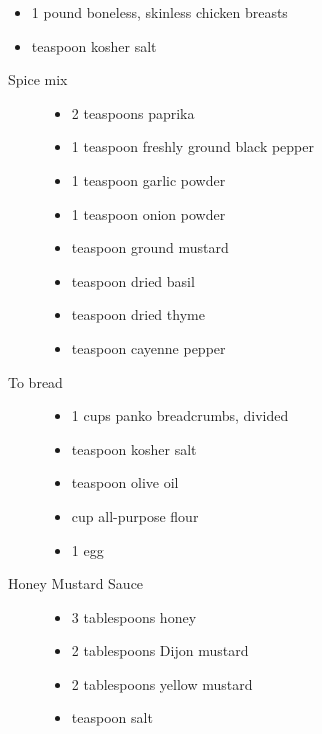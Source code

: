   \begin{itemize}
    \item 1 pound boneless, skinless chicken breasts
    \item {} teaspoon kosher salt
  \end{itemize}
\begin{description}
  \item[Spice mix]\hfill
    \begin{itemize}
    \item 2 teaspoons paprika
    \item 1 teaspoon freshly ground black pepper
    \item 1 teaspoon garlic powder
    \item 1 teaspoon onion powder
    \item {} teaspoon ground mustard
    \item {} teaspoon dried basil
    \item {} teaspoon dried thyme
    \item {} teaspoon cayenne pepper%
    \end{itemize}
  \item[To bread]\hfill
    \begin{itemize}
    \item 1 cups panko breadcrumbs, divided
    \item {} teaspoon kosher salt
    \item {} teaspoon olive oil
    \item {} cup all-purpose flour%
    \item 1 egg
    \end{itemize}
  \item[Honey Mustard Sauce]\hfill
    \begin{itemize}
    \item 3 tablespoons honey
    \item 2 tablespoons Dijon mustard
    \item 2 tablespoons yellow mustard
    \item {} teaspoon salt
    \end{itemize}
  \end{description}

